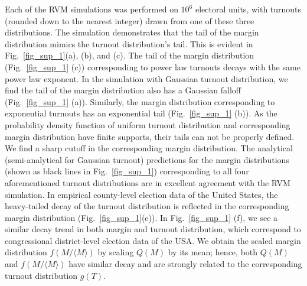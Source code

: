 \documentclass[reprint,aps,prl,showpacs,twocolumn, superscriptaddress]{revtex4-2}
\begin{document}
Each of the RVM simulations was performed on $10^6$ electoral units, with turnouts (rounded down to the nearest integer) drawn from one of these three distributions. The simulation demonstrates that the tail of the margin distribution mimics the turnout distribution's tail.  This is evident in Fig.~\ref{fig_sup_1}(a), (b), and (c). The tail of the margin distribution (Fig.~\ref{fig_sup_1} (c)) corresponding to power law turnouts decays with the same power law exponent.  In the simulation with Gaussian turnout distribution, we find the tail of the margin distribution also has a Gaussian falloff (Fig.~\ref{fig_sup_1} (a)). Similarly, the margin distribution corresponding to exponential turnouts has an exponential tail (Fig.~\ref{fig_sup_1} (b)). As the probability density function of uniform turnout distribution and corresponding margin distribution have finite supports, their tails can not be properly defined. We find a sharp cutoff in the corresponding margin distribution. The analytical (semi-analytical for Gaussian turnout) predictions for the margin distributions (shown as black lines in Fig.~\ref{fig_sup_1}) corresponding to all four aforementioned turnout distributions are in excellent agreement with the RVM simulation. In empirical county-level election data of the United States, the heavy-tailed decay of the turnout distribution is reflected in the corresponding margin distribution (Fig.~\ref{fig_sup_1}(e)). In Fig.~\ref{fig_sup_1} (f), we see a similar decay trend in both margin and turnout distribution, which correspond to congressional district-level election data of the USA. We obtain the scaled margin distribution $f(M / \langle M \rangle)$ by scaling $Q(M)$ by its mean; hence, both $Q(M)$ and $f(M / \langle M \rangle)$ have similar decay and are strongly related to the corresponding turnout distribution $g(T)$.
\end{document}
